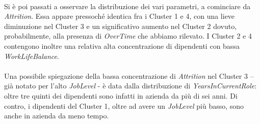 \begin{figure}[H]
\end{figure}
\noindent\\Si è poi passati a osservare la distribuzione dei vari parametri, a cominciare da \textit{Attrition}. Essa appare pressoché identica fra i Cluster 1 e 4, con una lieve diminuzione nel Cluster 3 e un significativo aumento nel Cluster 2 dovuto, probabilmente, alla presenza di \textit{OverTime} che abbiamo rilevato. I Cluster 2 e 4 contengono inoltre una relativa alta concentrazione di dipendenti con bassa \textit{WorkLifeBalance}.
\\\\
Una possibile spiegazione della bassa concentrazione di \textit{Attrition} nel Cluster 3 – già notato per l’alto \textit{JobLevel} - è data dalla distribuzione di \textit{YearsInCurrentRole}: oltre tre quinti dei dipendenti sono infatti in azienda da più di sei anni. Di contro, i dipendenti del Cluster 1, oltre ad avere un \textit{JobLevel} più basso, sono anche in azienda da meno tempo.
